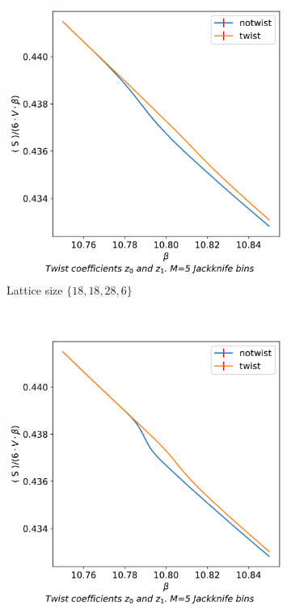 \documentclass[english,twoside,openright]{UH_TCM_MSc}
\begin{document}
\begin{figure}[!htb]
    \centering
    \begin{subfigure}[t]{0.5\textwidth}
        \centering
        \includegraphics[width=\textwidth]{final_plots/action_volume_comparison/action_18_18_28.pdf}
        \caption{Lattice size $\{18,18,28,6\}$}
    \end{subfigure}%
    ~ 
    \begin{subfigure}[t]{0.5\textwidth}
        \centering
        \includegraphics[width=\textwidth]{final_plots/action_volume_comparison/action_24_24_36.pdf}

\end{subfigure}
\end{figure}
\end{document}
